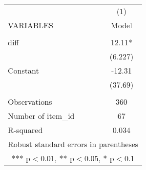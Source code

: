 \documentclass[]{article}
\begin{document}
\begin{tabular}{lc} \hline
 & (1) \\
VARIABLES & Model \\ \hline
 &  \\
diff & 12.11* \\
 & (6.227) \\
Constant & -12.31 \\
 & (37.69) \\
 &  \\
Observations & 360 \\
Number of item\_id & 67 \\
 R-squared & 0.034 \\ \hline
\multicolumn{2}{c}{ Robust standard errors in parentheses} \\
\multicolumn{2}{c}{ *** p$<$0.01, ** p$<$0.05, * p$<$0.1} \\
\end{tabular}
\end{document}
